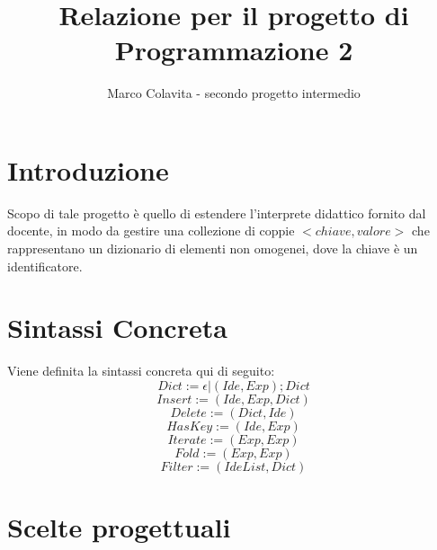\documentclass{article}
\title{Relazione per il progetto di Programmazione 2}
\author{Marco Colavita - secondo progetto intermedio}
\begin{document}
\maketitle

\section{Introduzione}
Scopo di tale progetto è quello di estendere l'interprete didattico fornito dal docente, in modo da gestire una collezione di coppie $<chiave,valore>$ che rappresentano un dizionario di elementi non omogenei, dove la chiave è un identificatore.

\section{Sintassi Concreta}
Viene definita la sintassi concreta qui di seguito:
\begin{equation}
    Dict:= \epsilon | (Ide,Exp);Dict 
\end{equation}
\begin{equation}
    Insert:= (Ide,Exp,Dict)
\end{equation}
\begin{equation}
    Delete:= (Dict,Ide)
\end{equation}
\begin{equation}
    HasKey := (Ide,Exp)
\end{equation}
\begin{equation}
    Iterate := (Exp,Exp)    
\end{equation}
\begin{equation}
    Fold := (Exp,Exp)    
\end{equation}
\begin{equation}
    Filter := (Ide List, Dict)
\end{equation}

\section{Scelte progettuali}
\end{document}

